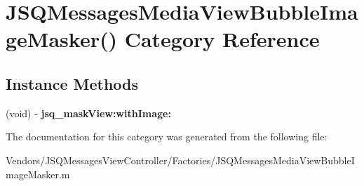 \hypertarget{category_j_s_q_messages_media_view_bubble_image_masker_07_08}{}\section{J\+S\+Q\+Messages\+Media\+View\+Bubble\+Image\+Masker() Category Reference}
\label{category_j_s_q_messages_media_view_bubble_image_masker_07_08}
\subsection*{Instance Methods}
\begin{DoxyCompactItemize}
\item 
\hypertarget{category_j_s_q_messages_media_view_bubble_image_masker_07_08_add0c8b4821125473ea297f4043d4a267}{}(void) -\/ {\bfseries jsq\+\_\+mask\+View\+:with\+Image\+:}\label{category_j_s_q_messages_media_view_bubble_image_masker_07_08_add0c8b4821125473ea297f4043d4a267}

\end{DoxyCompactItemize}


The documentation for this category was generated from the following file\+:\begin{DoxyCompactItemize}
\item 
Vendors/\+J\+S\+Q\+Messages\+View\+Controller/\+Factories/J\+S\+Q\+Messages\+Media\+View\+Bubble\+Image\+Masker.\+m\end{DoxyCompactItemize}
